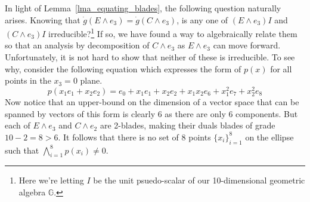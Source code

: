 \documentclass{birkjour}
\theoremstyle{definition}
\theoremstyle{remark}
\numberwithin{equation}{section}
\newcommand{\G}{\mathbb{G}}
\newcommand{\gd}{\dot{g}}
\begin{document}
In light of Lemma~\ref{lma_equating_blades}, the following question naturally arises.
Knowing that $\gd(E\wedge e_3)=\gd(C\wedge e_3)$, is any one of
$(E\wedge e_3)I$ and $(C\wedge e_3)I$ irreducible?\footnote{Here we're letting $I$
be the unit psuedo-scalar of our 10-dimensional geometric algebra $\G$.}  If so, we have found
a way to algebraically relate them so that an analysis by decomposition of $C\wedge e_3$
as $E\wedge e_3$ can move forward.  Unfortunately, it is not hard to show
that neither of these is irreducible.  To see why, consider the following equation which
expresses the form of $p(x)$ for all points in the $x_3=0$ plane.
\begin{equation*}
p(x_1e_1 + x_2e_2) = e_0 + x_1e_1 + x_2e_2 + x_1x_2e_6 + x_1^2e_7 + x_2^2e_8
\end{equation*}
Now notice that an upper-bound on the dimension of a vector space that can
be spanned by vectors of this form is clearly 6 as there are only 6 components.
But each of $E\wedge e_3$ and $C\wedge e_2$ are 2-blades, making their
duals blades of grade $10-2=8>6$.  It follows that there is no set of 8 points $\{x_i\}_{i=1}^8$
on the ellipse such that $\bigwedge_{i=1}^8 p(x_i)\neq 0$.



\end{document}
